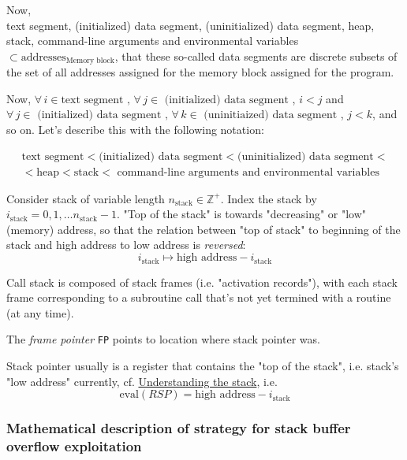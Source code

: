 \documentclass[10pt]{amsart}
\begin{document}
\begin{multicols*}{2}
Now, \\
text segment, (initialized) data segment, (uninitialized) data segment, heap, stack, command-line arguments and environmental variables $\subset \text{addresses}_{\text{Memory block}}$, that these so-called data segments are discrete subsets of the set of all addresses assigned for the memory block assigned for the program.  

Now, $\forall \, i \in \text{text segment }, \, \forall \, j \in \text{ (initialized) data segment }$, $i<j$ and $\forall \, j \in \text{ (initialized) data segment }, \, \forall \, k \in \text{ (uninitiaized) data segment }$, $j<k$, and so on.  Let's describe this with the following notation:  

\begin{equation}
\begin{gathered}
\text{text segment} < \text{(initialized) data segment} < \text{(uninitialized) data segment} < \\ 
< \text{heap} < \text{stack} < \text{ command-line arguments and environmental variables}  
\end{gathered}
\end{equation}


Consider stack of variable length $n_{\text{stack}} \in \mathbb{Z}^+$.  Index the stack by $i_{\text{stack}} = 0,1,\dots n_{\text{stack}} - 1$.  "Top of the stack" is towards "decreasing" or "low" (memory) address, so that the relation between "top of stack" to beginning of the stack and high address to low address is \emph{reversed}: 
\[
i_{\text{stack}} \mapsto \text{high address} - i_{\text{stack}}
\]

Call stack is composed of stack frames (i.e. "activation records"), with each stack frame corresponding to a subroutine call that's not yet termined with a routine (at any time).  

The \emph{frame pointer} \verb|FP| points to location where stack pointer was.  

Stack pointer usually is a register that contains the "top of the stack", i.e. stack's "low address" currently, cf. \href{https://www.cs.umd.edu/class/sum2003/cmsc311/Notes/Mips/stack.html}{Understanding the stack}, i.e. 
\begin{equation}
\text{eval}(RSP) = \text{high address} - i_{\text{stack}}
\end{equation}


\subsubsection{Mathematical description of strategy for stack buffer overflow exploitation}


\end{multicols*}
\end{document}
